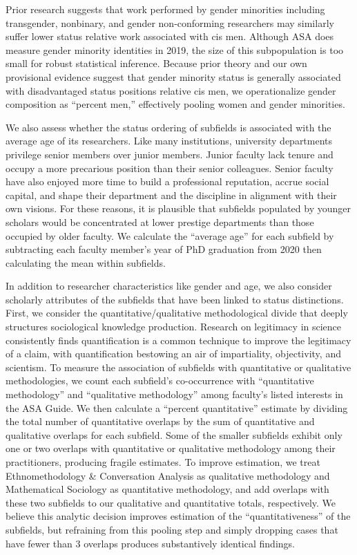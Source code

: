 \documentclass{article}
\begin{document}
Prior research suggests that work performed by gender minorities
including transgender, nonbinary, and gender non-conforming researchers
may similarly suffer lower status relative work associated with cis men.
Although ASA does measure gender minority identities in 2019, the size
of this subpopulation is too small for robust statistical inference.
Because prior theory and our own provisional evidence suggest that
gender minority status is generally associated with disadvantaged status
positions relative cis men, we operationalize gender composition as
``percent men,'' effectively pooling women and gender minorities.

We also assess whether the status ordering of subfields is associated
with the average age of its researchers. Like many institutions,
university departments privilege senior members over junior members.
Junior faculty lack tenure and occupy a more precarious position than
their senior colleagues. Senior faculty have also enjoyed more time to
build a professional reputation, accrue social capital, and shape their
department and the discipline in alignment with their own visions. For
these reasons, it is plausible that subfields populated by younger
scholars would be concentrated at lower prestige departments than those
occupied by older faculty. We calculate the ``average age'' for each
subfield by subtracting each faculty member's year of PhD graduation
from 2020 then calculating the mean within subfields.

In addition to researcher characteristics like gender and age, we also
consider scholarly attributes of the subfields that have been linked to
status distinctions. First, we consider the quantitative/qualitative
methodological divide that deeply structures sociological knowledge
production. Research on legitimacy in science consistently finds
quantification is a common technique to improve the legitimacy of a
claim, with quantification bestowing an air of impartiality,
objectivity, and scientism. To measure the association of subfields with
quantitative or qualitative methodologies, we count each subfield's
co-occurrence with ``quantitative methodology'' and ``qualitative
methodology'' among faculty's listed interests in the ASA Guide. We then
calculate a ``percent quantitative'' estimate by dividing the total
number of quantitative overlaps by the sum of quantitative and
qualitative overlaps for each subfield. Some of the smaller subfields
exhibit only one or two overlaps with quantitative or qualitative
methodology among their practitioners, producing fragile estimates. To
improve estimation, we treat Ethnomethodology \& Conversation Analysis
as qualitative methodology and Mathematical Sociology as quantitative
methodology, and add overlaps with these two subfields to our
qualitative and quantitative totals, respectively. We believe this
analytic decision improves estimation of the ``quantitativeness'' of the
subfields, but refraining from this pooling step and simply dropping
cases that have fewer than 3 overlaps produces substantively identical
findings.
\end{document}
